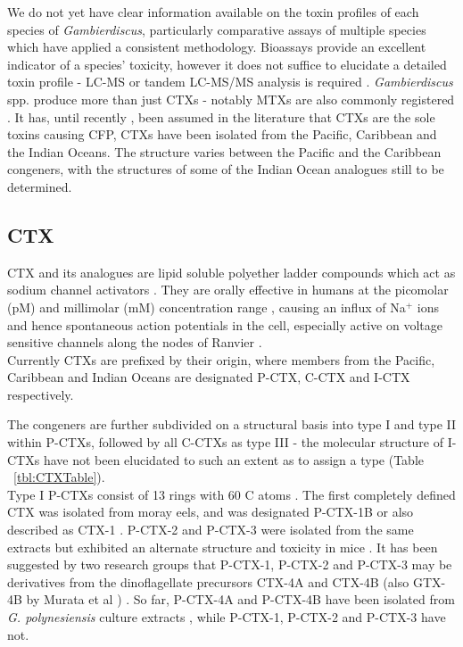 \documentclass[12pt]{article}
\begin{document}
We do not yet have clear information available on the toxin profiles of each species of \textit{Gambierdiscus}, particularly comparative assays of multiple species which have applied a consistent methodology. Bioassays provide an excellent indicator of a species' toxicity, however it does not suffice to elucidate a detailed toxin profile - LC-MS or tandem LC-MS/MS analysis is required \cite{diogened2014chemistry}. \emph{Gambierdiscus} spp. produce more than just CTXs - notably MTXs are also commonly registered \cite{holmes1994purification,murata1993structure}. It has, until recently \cite{kohli2014feeding}, been assumed in the literature that CTXs are the sole toxins causing CFP, CTXs have been isolated from the Pacific, Caribbean and the Indian Oceans. The  structure varies between the Pacific and the Caribbean congeners, with the structures of some of the Indian Ocean analogues still to be determined. \\

\subsection{CTX}
CTX and its analogues are lipid soluble polyether ladder compounds which act as sodium channel activators \cite{dechraoui1999ciguatoxins}. They are orally effective in humans at the picomolar (pM) and millimolar (mM) concentration range \cite{molgo2000ciguatera}, causing an influx of Na$^{+}$ ions and hence spontaneous action potentials in the cell, especially active on voltage sensitive channels along the nodes of Ranvier \cite{sims1987theoretical,mattei1999neurotoxins,lewis1992action,molgo2000ciguatera}. \\
Currently CTXs are prefixed by their origin, where members from the Pacific, Caribbean and Indian Oceans are designated P-CTX, C-CTX and I-CTX respectively. %

The congeners are further subdivided on a structural basis into type I and type II within P-CTXs, followed by all C-CTXs as type III - the molecular structure of I-CTXs have not been elucidated to such an extent as to assign a type \cite{legrand1997two,hamilton2002multiple,hamilton2002isolation} (Table ~\ref{tbl:CTXTable}).  \\

Type I P-CTXs consist of 13 rings with 60 C atoms \cite{murata1990structures,lewis1991purification,lewis1993origin}. The first completely defined CTX was isolated from moray eels, and was designated P-CTX-1B \cite{murata1990structures} or also described as CTX-1 \cite{lewis1991purification}. P-CTX-2 and P-CTX-3 were isolated from the same extracts but exhibited an alternate structure and toxicity in mice \cite{lewis1991purification}. It has been suggested by two research groups that P-CTX-1, P-CTX-2 and P-CTX-3 may be derivatives from the dinoflagellate precursors CTX-4A and CTX-4B (also GTX-4B by Murata et al \cite{murata1990structures}) \cite{lewis1993origin,yasumoto2000structural}. So far, P-CTX-4A and P-CTX-4B have been isolated from \emph{G. polynesiensis} culture extracts \cite{chinain2010growth}, while P-CTX-1, P-CTX-2 and P-CTX-3 have not. \\
\end{document}
